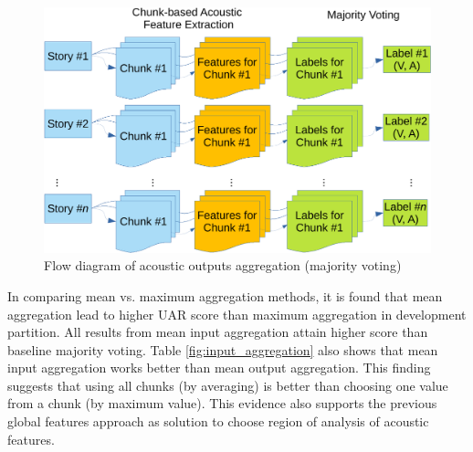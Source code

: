 \begin{figure}[htbp]
  \centering
  \includegraphics[width=.7\textwidth]{../fig/majority_voting-crop.pdf}
  \caption{Flow diagram of acoustic outputs aggregation (majority voting)}
  \label{fig:output_aggregation}
\end{figure}



In comparing mean vs. maximum aggregation methods, it is found that mean
aggregation lead to higher UAR score than maximum aggregation in development
partition. All results from mean input aggregation attain higher score than
baseline majority voting. Table \ref{fig:input_aggregation} also shows
that mean input aggregation works better than mean output aggregation. This
finding suggests that using all chunks (by averaging) is better than choosing
one value from a chunk (by maximum value). This evidence also supports the
previous global features approach as solution to choose region of analysis of
acoustic features.


